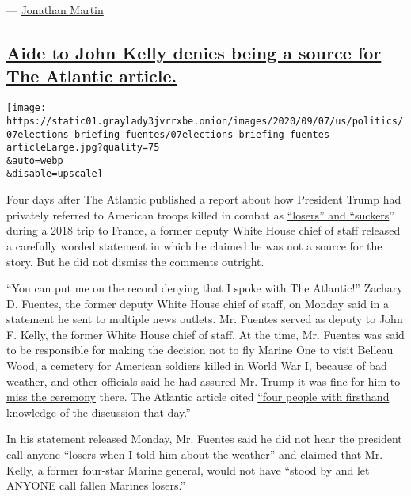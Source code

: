 ---
\href{https://www.nytimes3xbfgragh.onion/by/jonathan-martin}{Jonathan
Martin}

\hypertarget{aide-to-john-kelly-denies-being-a-source-for-the-atlantic-article}{%
\subsection{\texorpdfstring{\protect\hyperlink{aide-to-john-kelly-denies-being-a-source-for-the-atlantic-article}{Aide
to John Kelly denies being a source for The Atlantic
article.}}{Aide to John Kelly denies being a source for The Atlantic article.}}\label{aide-to-john-kelly-denies-being-a-source-for-the-atlantic-article}}

\texttt{[image: https://static01.graylady3jvrrxbe.onion/images/2020/09/07/us/politics/07elections-briefing-fuentes/07elections-briefing-fuentes-articleLarge.jpg?quality=75\\\&auto=webp\\\&disable=upscale]}

Four days after The Atlantic published a report about how President
Trump had privately referred to American troops killed in combat as
\href{https://www.nytimes3xbfgragh.onion/2020/09/04/us/politics/trump-veterans-losers.html}{``losers''
and ``suckers}'' during a 2018 trip to France, a former deputy White
House chief of staff released a carefully worded statement in which he
claimed he was not a source for the story. But he did not dismiss the
comments outright.

``You can put me on the record denying that I spoke with The Atlantic!''
Zachary D. Fuentes, the former deputy White House chief of staff, on
Monday said in a statement he sent to multiple news outlets. Mr. Fuentes
served as deputy to John F. Kelly, the former White House chief of
staff. At the time, Mr. Fuentes was said to be responsible for making
the decision not to fly Marine One to visit Belleau Wood, a cemetery for
American soldiers killed in World War I, because of bad weather, and
other officials
\href{https://www.nytimes3xbfgragh.onion/2020/09/04/us/politics/trump-veterans-losers.html}{said
he had assured Mr. Trump it was fine for him to miss the ceremony}
there. The Atlantic article cited
\href{https://www.theatlantic.com/politics/archive/2020/09/trump-americans-who-died-at-war-are-losers-and-suckers/615997/}{``four
people with firsthand knowledge of the discussion that day.''}

In his statement released Monday, Mr. Fuentes said he did not hear the
president call anyone ``losers when I told him about the weather'' and
claimed that Mr. Kelly, a former four-star Marine general, would not
have ``stood by and let ANYONE call fallen Marines losers.''

